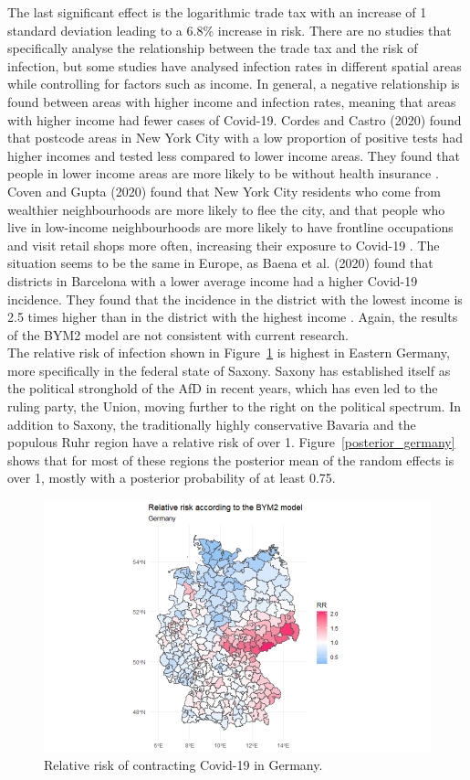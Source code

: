 The last significant effect is the logarithmic trade tax with an increase of 1 standard deviation leading to a 6.8\% increase in risk. There are no studies that specifically analyse the relationship between the trade tax and the risk of infection, but some studies have analysed infection rates in different spatial areas while controlling for factors such as income. In general, a negative relationship is found between areas with higher income and infection rates, meaning that areas with higher income had fewer cases of Covid-19. Cordes and Castro (2020) found that postcode areas in New York City with a low proportion of positive tests had higher incomes and tested less compared to lower income areas. They found that people in lower income areas are more likely to be without health insurance \autocite[][]{cordes2020spatial}. Coven and Gupta (2020) found that New York City residents who come from wealthier neighbourhoods are more likely to flee the city, and that people who live in low-income neighbourhoods are more likely to have frontline occupations and visit retail shops more often, increasing their exposure to Covid-19 \autocite[][]{coven2020disparities}. The situation seems to be the same in Europe, as Baena et al. (2020) found that districts in Barcelona with a lower average income had a higher Covid-19 incidence. They found that the incidence in the district with the lowest income is 2.5 times higher than in the district with the highest income \autocite[][]{baena2020impact}. Again, the results of the BYM2 model are not consistent with current research. \\
The relative risk of infection shown in Figure~\ref{rr_germany} is highest in Eastern Germany, more specifically in the federal state of Saxony. Saxony has established itself as the political stronghold of the AfD in recent years, which has even led to the ruling party, the Union, moving further to the right on the political spectrum. In addition to Saxony, the traditionally highly conservative Bavaria and the populous Ruhr region have a relative risk of over 1. Figure~\ref{posterior_germany} shows that for most of these regions the posterior mean of the random effects is over 1, mostly with a posterior probability of at least 0.75.
\begin{figure}[H]
  \centering
  \includegraphics[width = \textwidth]{relative_risk_germany.png}
  \caption{Relative risk of contracting Covid-19 in Germany.}
  \label{rr_germany}
\end{figure}

